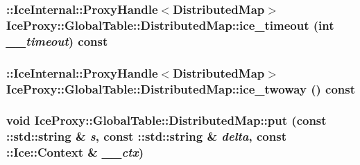 \label{class_ice_proxy_1_1_global_table_1_1_distributed_map_a1dc837dbc066fbd83a83b2c86fa6b14c}
\hypertarget{class_ice_proxy_1_1_global_table_1_1_distributed_map_ac2a72cb5d896a00ad19316493ed5a2fc}{
\subsubsection[{ice\_\-timeout}]{\setlength{\rightskip}{0pt plus 5cm}::IceInternal::ProxyHandle$<${\bf DistributedMap}$>$ IceProxy::GlobalTable::DistributedMap::ice\_\-timeout (int {\em \_\-\_\-timeout}) const}}
\label{class_ice_proxy_1_1_global_table_1_1_distributed_map_ac2a72cb5d896a00ad19316493ed5a2fc}
\hypertarget{class_ice_proxy_1_1_global_table_1_1_distributed_map_aa2a9797fbb4e4cb3bf97bc443e598087}{
\subsubsection[{ice\_\-twoway}]{\setlength{\rightskip}{0pt plus 5cm}::IceInternal::ProxyHandle$<${\bf DistributedMap}$>$ IceProxy::GlobalTable::DistributedMap::ice\_\-twoway () const}}
\label{class_ice_proxy_1_1_global_table_1_1_distributed_map_aa2a9797fbb4e4cb3bf97bc443e598087}
\hypertarget{class_ice_proxy_1_1_global_table_1_1_distributed_map_a7510d666de09272847660a1709cf8b73}{
\subsubsection[{put}]{\setlength{\rightskip}{0pt plus 5cm}void IceProxy::GlobalTable::DistributedMap::put (const ::std::string \& {\em s}, \/  const ::std::string \& {\em delta}, \/  const ::Ice::Context \& {\em \_\-\_\-ctx})}}
